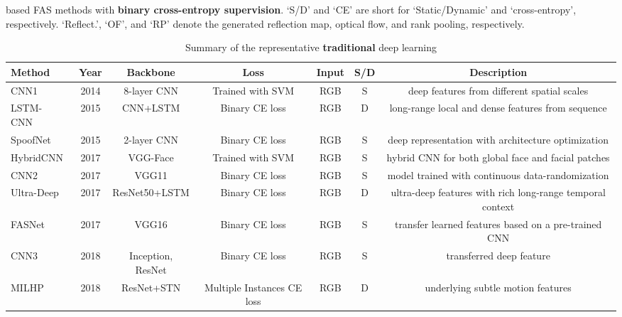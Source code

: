 \documentclass[10pt,journal,compsoc]{IEEEtran}
\begin{document}
\begin{table}
\centering
\caption{Summary of the representative \textbf{traditional} deep learning} based FAS methods with \textbf{binary cross-entropy supervision}. `S/D' and `CE' are short for `Static/Dynamic' and `cross-entropy', respectively. `Reflect.', `OF', and `RP' denote the generated reflection map, optical flow, and rank pooling, respectively. \label{tab:binaryloss}
\resizebox{1.0\textwidth}{!} {\begin{tabular}{l c c c c c c} 
 \toprule[1pt]
 Method & Year & Backbone & Loss & Input & S/D & Description \\
 

   \midrule
CNN1~\cite{yang2014learn} & 2014 & 8-layer CNN & Trained with SVM & RGB & S & deep features from different spatial scales  \\ 
 
 
 
   \midrule
LSTM-CNN~\cite{Xu2016Learning} & 2015 & CNN+LSTM  & Binary CE loss & RGB & D & long-range local and dense features from sequence \\ 
  

   \midrule
SpoofNet~\cite{menotti2015deep} & 2015 & 2-layer CNN  & Binary CE loss & RGB & S & deep representation with architecture optimization \\ 

   \midrule
HybridCNN~\cite{li2017face} & 2017 & VGG-Face  & Trained with SVM & RGB & S & hybrid CNN for both global face and facial patches \\ 


   \midrule
CNN2~\cite{nagpal2019performance} & 2017 & VGG11 & Binary CE loss & RGB & S & model trained with continuous data-randomization  \\ 


   \midrule
Ultra-Deep~\cite{tu2017ultra} & 2017 & ResNet50+LSTM & Binary CE loss & RGB & D & ultra-deep features with rich long-range temporal context \\ 

    \midrule
FASNet~\cite{lucena2017transfer} & 2017 & VGG16  & Binary CE loss & RGB & S & transfer learned features based on a pre-trained CNN \\ 
 

   \midrule
CNN3~\cite{rehman2017deep} & 2018 & Inception, ResNet & Binary CE loss & RGB & S & transferred deep feature  \\ 
 
 
  \midrule
 MILHP~\cite{lin2018live} & 2018 & ResNet+STN  & Multiple Instances CE loss & RGB & D & underlying subtle motion features\\ 



\end{tabular}}
\end{table}
\end{document}
